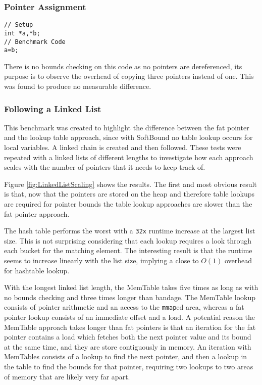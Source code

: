 \subsubsection{Pointer Assignment}

\begin{verbatim}
// Setup
int *a,*b;
// Benchmark Code
a=b;
\end{verbatim}

There is no bounds checking on this code as no pointers are dereferenced, its purpose is to observe the overhead of copying three pointers instead of one.
This was found to produce no measurable difference.

\subsubsection{Following a Linked List}

This benchmark was created to highlight the difference between the fat pointer and the lookup table approach, since with SoftBound no table lookup occurs for local variables.
A linked chain is created and then followed.
These tests were repeated with a linked lists of different lengths to investigate how each approach scales with the number of pointers that it needs to keep track of.



Figure \ref{fig:LinkedListScaling} shows the results.
The first and most obvious result is that, now that the pointers are stored on the heap and therefore table lookups are required for pointer bounds the table lookup approaches are slower than the fat pointer approach.

The hash table performs the worst with a \verb!32x! runtime increase at the largest list size.
This is not surprising considering that each lookup requires a look through each bucket for the matching element.
The interesting result is that the runtime seems to increase linearly with the list size, implying a close to $O(1)$ overhead for hashtable lookup.

With the longest linked list length, the MemTable takes five times as long as with no bounds checking and three times longer than bandage.
The MemTable lookup consists of pointer arithmetic and an access to the \verb!mmap!ed area, whereas a fat pointer lookup consists of an immediate offset and a load.
A potential reason the MemTable approach takes longer than fat pointers is that an iteration for the fat pointer contains a load which fetches both the next pointer value and its bound at the same time, and they are store contiguously in memory.
An iteration with MemTables consists of a lookup to find the next pointer, and then a lookup in the table to find the bounds for that pointer, requiring two lookups to two areas of memory that are likely very far apart.

